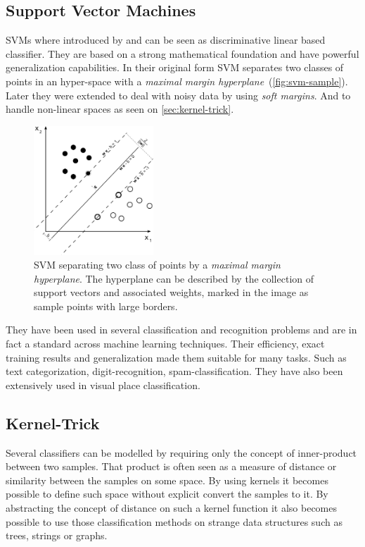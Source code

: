 \subsection{Support Vector Machines}
\Glspl{SVM} where introduced by \cite{cortes1995support} and can be seen as
discriminative linear based classifier. They are based on a strong mathematical
foundation and have powerful generalization capabilities. In their original form
\gls{SVM} separates two classes of points in an hyper-space with a
\emph{maximal margin hyperplane}~(\autoref{fig:svm-sample}).
Later they were extended to deal with noisy data by using \emph{soft margins}.
And to handle non-linear spaces as seen on \autoref{sec:kernel-trick}.

\begin{figure}[h]
\begin{center}
\includegraphics[width=0.4\textwidth]{figures/Svm_max_sep_hyperplane_with_margin}
\end{center}
\caption{{SVM} separating two class of points by a
         \emph{maximal margin hyperplane}. The hyperplane can be described by
         the collection of support vectors and associated weights, marked in the
         image as sample points with large borders.}
\label{fig:svm-sample}
\end{figure}

They have been used in several classification and recognition problems and are
in fact a standard across machine learning techniques. Their efficiency, exact
training results and generalization made them suitable for many tasks. Such as
text categorization, digit-recognition, spam-classification.
They have also been extensively used in visual place classification.

\subsection{Kernel-Trick}
\label{sec:kernel-trick}
Several classifiers can be modelled by requiring only the concept of inner\hyp{}product
between two samples. That product is often seen as a measure of distance or similarity
between the samples on some space. By using kernels it becomes possible to define such
space without explicit convert the samples to it. By abstracting the concept of distance
on such a kernel function it also becomes possible to use those classification methods
on strange data structures such as trees, strings or graphs.

